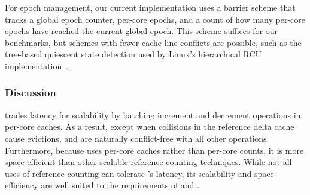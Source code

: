 For epoch management, our current implementation uses a barrier scheme
that tracks a global epoch counter, per-core epochs, and a count of
how many per-core epochs have reached the current global epoch.  This
scheme suffices for our benchmarks, but schemes with fewer cache-line
conflicts are
possible, such as the tree-based quiescent state detection used
by Linux's hierarchical RCU implementation~\cite{lwn:treercu}.

\subsubsection{Discussion}
 trades latency for scalability by batching increment and
decrement operations in per-core caches.  As a result, except when
collisions in the reference delta cache cause evictions, 
and  are naturally conflict-free with all other operations.
%
Furthermore, because  uses per-core caches
rather than per-core counts, it is more space-efficient than other
scalable reference counting techniques.  While not all uses of
reference counting can tolerate 's latency, its scalability
and space-efficiency are well suited to the requirements of \vm and
\fs.

